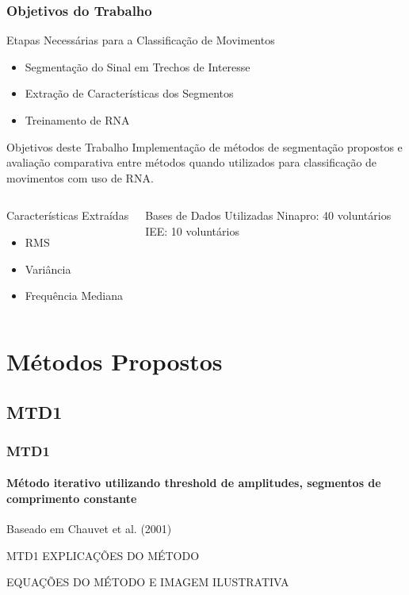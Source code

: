 \documentclass{beamer}
\begin{document}
	\begin{frame}
		\frametitle{Objetivos do Trabalho}
		
		\begin{alertblock}{Etapas Necessárias para a Classificação de Movimentos}
		\begin{itemize}
			\item Segmentação do Sinal em Trechos de Interesse
			\item Extração de Características dos Segmentos
			\item Treinamento de RNA
		\end{itemize}
		\end{alertblock}
		
		\begin{block}{Objetivos deste Trabalho}
			Implementação de métodos de segmentação propostos e avaliação comparativa entre métodos quando utilizados para classificação de movimentos com uso de RNA.
		\end{block}
		
		\begin{columns}[c]
		
				\begin{exampleblock}{Características Extraídas}
					\begin{itemize}
						\item RMS
						\item Variância
						\item Frequência Mediana
					\end{itemize}
				\end{exampleblock}
				
				\begin{exampleblock}{Bases de Dados Utilizadas}
					Ninapro: 40 voluntários\\
					IEE: 10 voluntários
				\end{exampleblock}
		
		\end{columns}
	\end{frame}

	\section[Métodos Propostos]{Métodos Propostos}
	
	\subsection[MTD1]{MTD1}
	\begin{frame}
		\frametitle{MTD1}
		\framesubtitle{Método iterativo utilizando threshold de amplitudes, segmentos de comprimento constante}
		
		Baseado em Chauvet et al. (2001)
		
		\begin{block}{MTD1}
			EXPLICAÇÕES DO MÉTODO
		\end{block}
		
		EQUAÇÕES DO MÉTODO E IMAGEM ILUSTRATIVA
		
	\end{frame}
	
\end{document}
